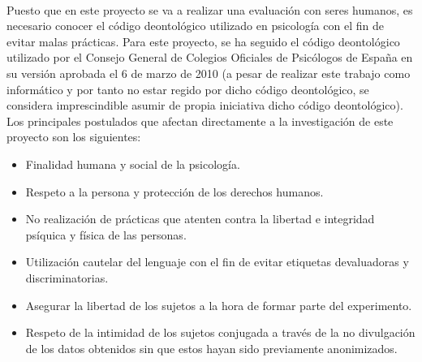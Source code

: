 \paragraph{}
Puesto que en este proyecto se va a realizar una evaluación con seres humanos, es necesario conocer el código deontológico utilizado en psicología con el fin de evitar malas prácticas. Para este proyecto, se ha seguido el código deontológico utilizado por el Consejo General de Colegios Oficiales de Psicólogos de España en su versión aprobada el 6 de marzo de 2010 (a pesar de realizar este trabajo como informático y por tanto no estar regido por dicho código deontológico, se considera imprescindible asumir de propia iniciativa dicho código deontológico). Los principales postulados que afectan directamente a la investigación de este proyecto son los siguientes:
\begin{itemize}
    \item Finalidad humana y social de la psicología.
    \item Respeto a la persona y protección de los derechos humanos.
    \item No realización de prácticas que atenten contra la libertad e integridad psíquica y física de las personas.
    \item Utilización cautelar del lenguaje con el fin de evitar etiquetas devaluadoras y discriminatorias.
    \item Asegurar la libertad de los sujetos a la hora de formar parte del experimento.
    \item Respeto de la intimidad de los sujetos conjugada a través de la no divulgación de los datos obtenidos sin que estos hayan sido previamente anonimizados.
\end{itemize}
